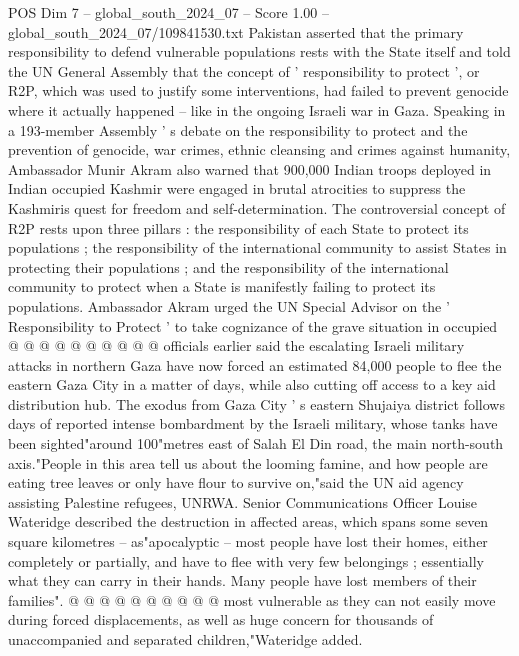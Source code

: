 \begin{textsample}{POS Dim 7 – global\_south\_2024\_07 – Score 1.00 – global\_south\_2024\_07/109841530.txt}  \label{ex:f7_pos_119}
Pakistan asserted that the primary responsibility to defend vulnerable populations rests with the State itself and told the UN General Assembly that the concept of ' responsibility to protect ', or R2P, which was used to justify some interventions, had failed to prevent genocide where it actually happened -- like in the ongoing Israeli war in Gaza.
Speaking in a 193-member Assembly ' s debate on the responsibility to protect and the prevention of genocide, war crimes, ethnic cleansing and crimes against humanity, Ambassador Munir Akram also warned that 900,000 Indian troops deployed in Indian occupied Kashmir were engaged in brutal atrocities to suppress the Kashmiris quest for freedom and self-determination.
The controversial concept of R2P rests upon three pillars : the responsibility of each State to protect its populations ; the responsibility of the international community to assist States in protecting their populations ; and the responsibility of the international community to protect when a State is manifestly failing to protect its populations.
Ambassador Akram urged the UN Special Advisor on the ' Responsibility to Protect ' to take cognizance of the grave situation in occupied @ @ @ @ @ @ @ @ @ @ officials earlier said the escalating Israeli military attacks in northern Gaza have now forced an estimated 84,000 people to flee the eastern Gaza City in a matter of days, while also cutting off access to a key aid distribution hub.
The exodus from Gaza City ' s eastern Shujaiya district follows days of reported intense bombardment by the Israeli military, whose tanks have been sighted"around 100"metres east of Salah El Din road, the main north-south axis."People in this area tell us about the looming famine, and how people are eating tree leaves or only have flour to survive on,"said the UN aid agency assisting Palestine refugees, UNRWA.
Senior Communications Officer Louise Wateridge described the destruction in affected areas, which spans some seven square kilometres -- as"apocalyptic -- most people have lost their homes, either completely or partially, and have to flee with very few belongings ; essentially what they can carry in their hands.
Many people have lost members of their families". @ @ @ @ @ @ @ @ @ @ most vulnerable as they can not easily move during forced displacements, as well as huge concern for thousands of unaccompanied and separated children,"Wateridge added.

\end{textsample}
